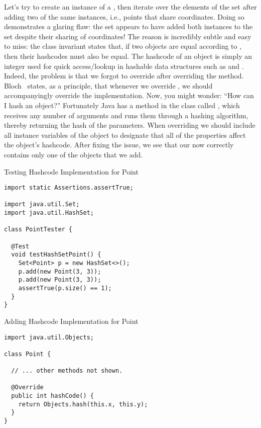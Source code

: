 Let's try to create an instance of a , then iterate over the elements of the set after adding two of the same  instances, i.e., points that share coordinates. Doing so demonstrates a glaring flaw: the set appears to have added both  instances to the set despite their sharing of coordinates! The reason is incredibly subtle and easy to miss: the  class invariant states that, if two objects are equal according to , then their hashcodes must also be equal. The hashcode of an object is simply an integer used for quick access/lookup in hashable data structures such as  and . Indeed, the problem is that we forgot to override  after overriding the  method. Bloch~\cite{effectivejava} states, as a principle, that whenever we override , we should accompanyingly override the  implementation. Now, you might wonder: ``How can I hash an object?'' Fortunately Java has a method in the  class called , which receives any number of arguments and runs them through a hashing algorithm, thereby returning the hash of the parameters. When overriding  we should include all instance variables of the object to designate that all of the properties affect the object's hashcode. After fixing the issue, we see that our  now correctly contains only one of the  objects that we add.

\begin{cl}[]{Testing Hashcode Implementation for Point}
\begin{lstlisting}[language=MyJava]
import static Assertions.assertTrue;

import java.util.Set;
import java.util.HashSet;

class PointTester {

  @Test
  void testHashSetPoint() {
    Set<Point> p = new HashSet<>();
    p.add(new Point(3, 3));
    p.add(new Point(3, 3));
    assertTrue(p.size() == 1);
  }
}
\end{lstlisting}
\end{cl}

\begin{cl}[]{Adding Hashcode Implementation for Point}
\begin{lstlisting}[language=MyJava]
import java.util.Objects;

class Point {

  // ... other methods not shown.

  @Override
  public int hashCode() {
    return Objects.hash(this.x, this.y);
  }
}
\end{lstlisting}
\end{cl}

